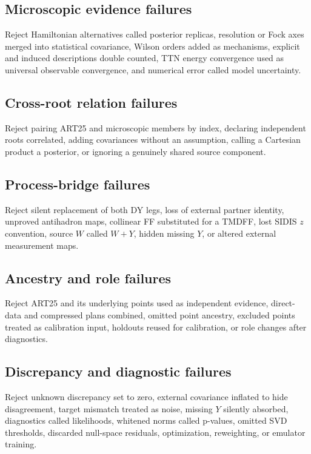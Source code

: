 \documentclass[11pt]{article}
\begin{document}
\subsection{Microscopic evidence failures}

Reject Hamiltonian alternatives called posterior replicas, resolution or Fock axes merged into statistical covariance, Wilson orders added as mechanisms, explicit and induced descriptions double counted, TTN energy convergence used as universal observable convergence, and numerical error called model uncertainty.

\subsection{Cross-root relation failures}

Reject pairing ART25 and microscopic members by index, declaring independent roots correlated, adding covariances without an assumption, calling a Cartesian product a posterior, or ignoring a genuinely shared source component.

\subsection{Process-bridge failures}

Reject silent replacement of both DY legs, loss of external partner identity, unproved antihadron maps, collinear FF substituted for a TMDFF, lost SIDIS \(z\) convention, source \(W\) called \(W+Y\), hidden missing \(Y\), or altered external measurement maps.

\subsection{Ancestry and role failures}

Reject ART25 and its underlying points used as independent evidence, direct-data and compressed plans combined, omitted point ancestry, excluded points treated as calibration input, holdouts reused for calibration, or role changes after diagnostics.

\subsection{Discrepancy and diagnostic failures}

Reject unknown discrepancy set to zero, external covariance inflated to hide disagreement, target mismatch treated as noise, missing \(Y\) silently absorbed, diagnostics called likelihoods, whitened norms called p-values, omitted SVD thresholds, discarded null-space residuals, optimization, reweighting, or emulator training.
\end{document}
